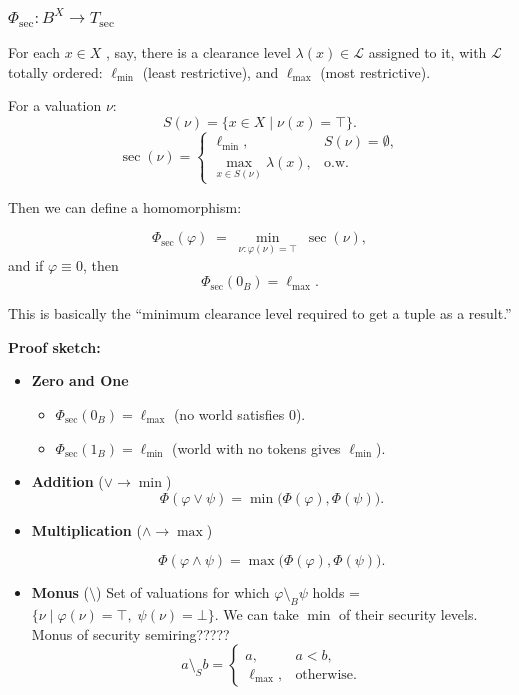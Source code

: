 \subsubsection{$\Phi_{\mathrm{sec}}: B^X \to T_{\sec}$}

For each \(x\in X\) , say, there is a clearance level \(\lambda(x)\in \mathcal L\) assigned to it,
with \(\mathcal L\) totally ordered: \(\ell_{\min}\) (least restrictive),
and \(\ell_{\max}\) (most restrictive).

For a valuation \(\nu\):
\[
S(\nu) = \{x\in X \mid \nu(x)=\top\}.
\]
\[
\sec(\nu) =
\begin{cases}
\ell_{\min}, & S(\nu)=\emptyset,\\
\max_{x\in S(\nu)} \lambda(x), & \text{o.w.}
\end{cases}
\]



Then we can define a homomorphism:

\[
\Phi_{\mathrm{sec}}(\varphi)
\;=\;
\min_{\nu:\varphi(\nu)=\top}\;\sec(\nu),
\]
and if \(\varphi\equiv 0\), then
\[
\Phi_{\mathrm{sec}}(0_B) = \ell_{\max}.
\]

This is basically the “minimum clearance level required to get a tuple as a result.”



\textbf{Proof sketch:}
\begin{itemize}
    \item \textbf{Zero and One}  
        \begin{itemize}
            \item \(\Phi_{\mathrm{sec}}(0_B)=\ell_{\max}\) (no world satisfies 0).
            \item \(\Phi_{\mathrm{sec}}(1_B)=\ell_{\min}\) (world with no tokens gives \(\ell_{\min}\)).
        \end{itemize}
    \item \textbf{Addition} (\(\vee \to \min\))  
        \[
            \Phi(\varphi\vee\psi)
            = \min\bigl(\Phi(\varphi),\Phi(\psi)\bigr).
        \]
    \item \textbf{Multiplication} (\(\wedge \to \max\))  
        
        \[
            \Phi(\varphi\wedge\psi)
            = \max\bigl(\Phi(\varphi),\Phi(\psi)\bigr).
        \]
    \item \textbf{Monus} (\(\setminus\))  
        Set of valuations for which  \(\varphi\setminus_B\psi\) holds =  
        \(\{\nu \mid \varphi(\nu)=\top,\;\psi(\nu)=\bot\}\).  
        We can take \(\min\) of their security levels.
        Monus of security semiring?????
        \[
            a\setminus_S b =
            \begin{cases}
                a, & a<b,\\
                \ell_{\max}, &\text{otherwise}.
            \end{cases}
        \]
\end{itemize}

